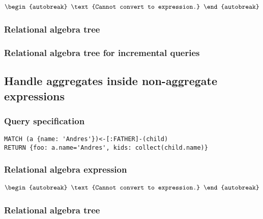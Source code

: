 \begin{align*}
\begin{autobreak}
\text{Cannot convert to expression.}
\end{autobreak}
\end{align*}

\subsubsection*{Relational algebra tree}


\subsubsection*{Relational algebra tree for incremental queries}


\subsection{Handle aggregates inside non-aggregate expressions}

\subsubsection*{Query specification}

\begin{lstlisting}
MATCH (a {name: 'Andres'})<-[:FATHER]-(child)
RETURN {foo: a.name='Andres', kids: collect(child.name)}
\end{lstlisting}

\subsubsection*{Relational algebra expression}

\begin{align*}
\begin{autobreak}
\text{Cannot convert to expression.}
\end{autobreak}
\end{align*}

\subsubsection*{Relational algebra tree}


